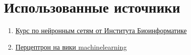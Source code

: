 \section{Использованные источники}

	\begin{enumerate}
		\item {\href{https://stepik.org/course/401}{Курс по нейронным сетям от Института Биоинформатике}}
		\item {\href{https://www.machinelearning.ru/wiki/index.php?title=Персептрон}{Перцептрон на вики machinelearning}}
	\end{enumerate}